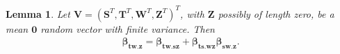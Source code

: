 \documentclass[11pt,a4paper]{article}
\newtheorem{Lemma}[Satz]{Lemma}
\theoremstyle{definition}
\theoremstyle{remark}
\begin{document}
%
%
%
%
%




\begin{Lemma}\label{Cochran}
	Let $\mathbf{V} = (\mathbf{S}^T,\mathbf{T}^T,\mathbf{W}^T,\mathbf{Z}^T)^T$, with $\mathbf{Z}$ possibly of length zero, be a mean $\mathbf{0}$ random vector with finite variance.
Then
\begin{align}
\label{Cochran1} 
\boldsymbol{\beta}_{\mathbf{tw}.\mathbf{z}} = 
\boldsymbol{\beta}_{\mathbf{tw}.\mathbf{sz}} 
+ \boldsymbol{\beta}_{\mathbf{ts}.\mathbf{wz}} \boldsymbol{\beta}_{\mathbf{sw}.\mathbf{z}}.  
\end{align}

\end{Lemma}
\end{document}
